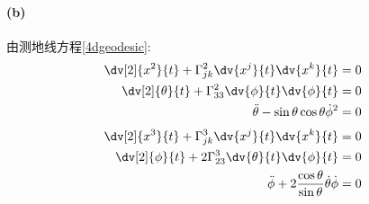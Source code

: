 \paragraph{(b)}
由测地线方程\ref{4dgeodesic}:
\begin{align*}
        \dv[2]{x^2}{t} + \Gamma^2_{jk}\dv{x^j}{t}\dv{x^k}{t} &= 0\\
        \dv[2]{\theta}{t} + \Gamma^2_{33}\dv{\phi}{t}\dv{\phi}{t} &= 0\\
        \ddot{\theta} - \sin\theta\cos\theta\dot{\phi}^2 &=0
\end{align*}
 \begin{align*}
        \dv[2]{x^3}{t} + \Gamma^3_{jk}\dv{x^j}{t}\dv{x^k}{t} &= 0\\
        \dv[2]{\phi}{t} + 2\Gamma^3_{23}\dv{\theta}{t}\dv{\phi}{t} &= 0\\
        \ddot{\phi} + 2\frac{\cos\theta}{\sin\theta}\dot{\theta}\dot{\phi} &=0
\end{align*}
